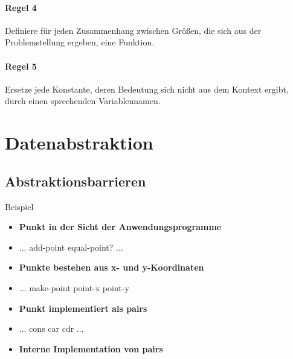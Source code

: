 \documentclass[../main.tex]{subfiles}
\begin{document}
        \paragraph{Regel 4}
            Definiere für jeden Zusammenhang zwischen Größen, die sich aus der Problemstellung ergeben, eine Funktion.
            
        \paragraph{Regel 5}
            Ersetze jede Konstante, deren Bedeutung sich nicht aus dem Kontext ergibt, durch einen sprechenden Variablennamen.
            
    \section{Datenabstraktion}
        \subsection{Abstraktionsbarrieren}
            Beispiel 
            
            \begin{itemize}
                \item \textbf{Punkt in der Sicht der Anwendungsprogramme}
                \item ... add-point equal-point? ...
                \item \textbf{Punkte bestehen aus x- und y-Koordinaten}
                \item ... make-point point-x point-y
                \item \textbf{Punkt implementiert als pairs}
                \item ... cons car cdr ...
                \item \textbf{Interne Implementation von pairs}
            \end{itemize}
        
\end{document}
